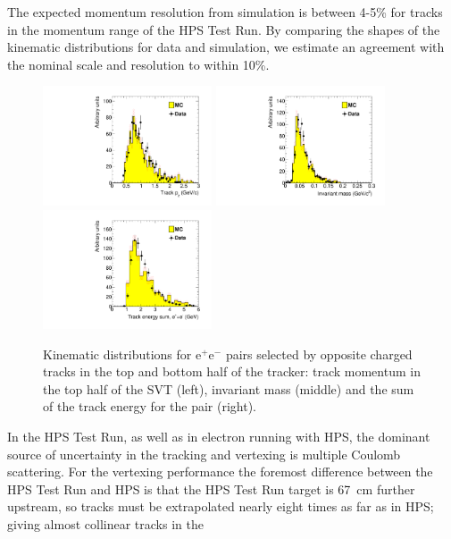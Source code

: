 \documentclass[final,3p,times,twocolumn]{elsarticle}
\newcommand{\ee}{e$^+$e$^-$}
\begin{document}
The expected momentum resolution from simulation is between 4-5\% for tracks in the momentum 
range of the HPS Test Run. By comparing the shapes of the kinematic distributions for data and simulation, we 
estimate an agreement with the nominal scale and resolution to within 10\%.
 \begin{center}
\begin{figure}[t]
\includegraphics[width=5cm]{h_trk_top_px_h_trk_top_px_trigsel4hit_pair1351_twotrkfilt-v6-paper-mod}
\includegraphics[width=5cm]{h_invM_h_invM_trigsel4hit_pair1351_twotrkfilt-v6-paper-mod}
\includegraphics[width=5cm]{h_sumE_h_sumE_trigsel4hit_pair1351_twotrkfilt-v6-paper}
\caption{\small Kinematic distributions for \ee{} pairs selected by opposite charged tracks in the top and bottom half of the tracker: track momentum in the top half of the SVT (left), invariant mass (middle) and the sum of the track energy for the pair (right). 
\label{fig:pair_kin}}
\end{figure}
\end{center}
In the HPS Test Run, as well as in electron running with HPS, the dominant source of uncertainty in the 
tracking and vertexing is multiple Coulomb scattering. For the vertexing performance the foremost 
difference between the HPS Test Run and HPS is that the HPS Test Run target is 67~cm further upstream, 
so tracks must be extrapolated nearly eight times as far as in HPS; giving almost collinear tracks in the 
\end{document}
